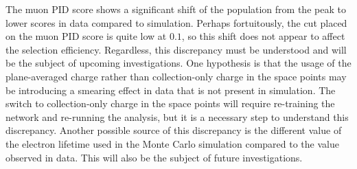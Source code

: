 The muon PID score shows a significant shift of the population from the peak to lower scores in data compared to simulation. Perhaps fortuitously, the cut placed on the muon PID score is quite low at $0.1$, so this shift does not appear to affect the selection efficiency. Regardless, this discrepancy must be understood and will be the subject of upcoming investigations. One hypothesis is that the usage of the plane-averaged charge rather than collection-only charge in the space points may be introducing a smearing effect in data that is not present in simulation. The switch to collection-only charge in the space points will require re-training the network and re-running the analysis, but it is a necessary step to understand this discrepancy. Another possible source of this discrepancy is the different value of the electron lifetime used in the Monte Carlo simulation compared to the value observed in data. This will also be the subject of future investigations.

